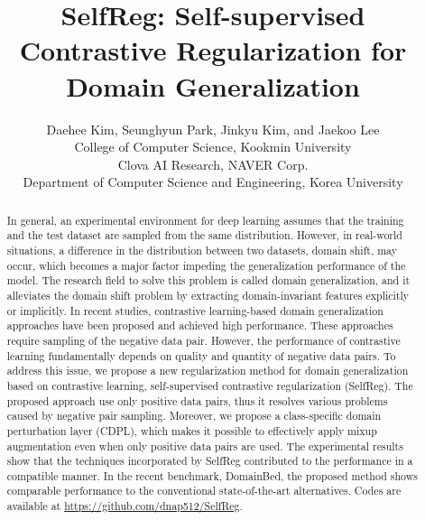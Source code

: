 \documentclass[10pt,twocolumn,letterpaper]{article}
\begin{document}
\title{SelfReg: Self-supervised Contrastive Regularization for Domain Generalization}

\author{Daehee Kim, Seunghyun Park, Jinkyu Kim, and Jaekoo Lee \\
\small{ College of Computer Science, Kookmin University}\\
\small{Clova AI Research, NAVER Corp.} \\
\small{ Department of Computer Science and Engineering, Korea University}
}






\maketitle

\begin{abstract}
In general, an experimental environment for deep learning assumes that the training and the test dataset are sampled from the same distribution. However, in real-world situations, a difference in the distribution between two datasets, domain shift, may occur, which becomes a major factor impeding the generalization performance of the model. The research field to solve this problem is called domain generalization, and it alleviates the domain shift problem by extracting domain-invariant features explicitly or implicitly.
In recent studies, contrastive learning-based domain generalization approaches have been proposed and achieved high performance. These approaches require sampling of the negative data pair. However, the performance of contrastive learning fundamentally depends on quality and quantity of negative data pairs.
To address this issue, we propose a new regularization method for domain generalization based on contrastive learning, self-supervised contrastive regularization (SelfReg). The proposed approach use only positive data pairs, thus it resolves various problems caused by negative pair sampling. Moreover, we propose a class-specific domain perturbation layer (CDPL), which makes it possible to effectively apply mixup augmentation even when only positive data pairs are used.
The experimental results show that the techniques incorporated by SelfReg contributed to the performance in a compatible manner. In the recent benchmark, DomainBed, the proposed method shows comparable performance to the conventional state-of-the-art alternatives. 
Codes are available at \href{https://github.com/dnap512/SelfReg}{https://github.com/dnap512/SelfReg}.
\end{abstract}
\end{document}
